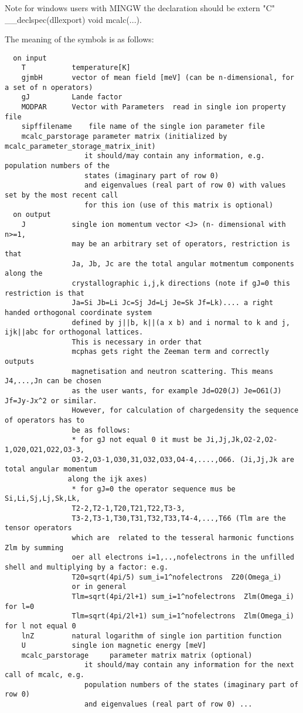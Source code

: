 Note for windows users with MINGW the declaration should be {\prg extern "C" \_\_declspec(dllexport) void %
mcalc(...)}.

The meaning of the symbols is as follows:
{\footnotesize
\begin{verbatim}
  on input
    T           temperature[K]
    gjmbH       vector of mean field [meV] (can be n-dimensional, for a set of n operators)
    gJ          Lande factor
    MODPAR      Vector with Parameters  read in single ion property file
    sipffilename    file name of the single ion parameter file
    mcalc_parstorage parameter matrix (initialized by mcalc_parameter_storage_matrix_init)
                   it should/may contain any information, e.g. population numbers of the
				   states (imaginary part of row 0)
                   and eigenvalues (real part of row 0) with values set by the most recent call
                   for this ion (use of this matrix is optional)
  on output    
    J           single ion momentum vector <J> (n- dimensional with n>=1,
                may be an arbitrary set of operators, restriction is that 
                Ja, Jb, Jc are the total angular motmentum components along the
                crystallographic i,j,k directions (note if gJ=0 this restriction is that
                Ja=Si Jb=Li Jc=Sj Jd=Lj Je=Sk Jf=Lk).... a right handed orthogonal coordinate system 
                defined by j||b, k||(a x b) and i normal to k and j, ijk||abc for orthogonal lattices. 
                This is necessary in order that
                mcphas gets right the Zeeman term and correctly outputs
                magnetisation and neutron scattering. This means J4,...,Jn can be chosen 
                as the user wants, for example Jd=O20(J) Je=O61(J) Jf=Jy-Jx^2 or similar.
                However, for calculation of chargedensity the sequence of operators has to
                be as follows: 
                * for gJ not equal 0 it must be Ji,Jj,Jk,O2-2,O2-1,O20,O21,O22,O3-3,
                O3-2,O3-1,O30,31,O32,O33,O4-4,....,O66. (Ji,Jj,Jk are total angular momentum
               along the ijk axes)
                * for gJ=0 the operator sequence mus be Si,Li,Sj,Lj,Sk,Lk,
                T2-2,T2-1,T20,T21,T22,T3-3,
                T3-2,T3-1,T30,T31,T32,T33,T4-4,...,T66 (Tlm are the tensor operators 
                which are  related to the tesseral harmonic functions Zlm by summing
                oer all electrons i=1,..,nofelectrons in the unfilled shell and multiplying by a factor: e.g.
                T20=sqrt(4pi/5) sum_i=1^nofelectrons  Z20(Omega_i)
                or in general
                Tlm=sqrt(4pi/2l+1) sum_i=1^nofelectrons  Zlm(Omega_i)  for l=0
                Tlm=sqrt(4pi/2l+1) sum_i=1^nofelectrons  Zlm(Omega_i)  for l not equal 0
    lnZ         natural logarithm of single ion partition function
    U           single ion magnetic energy [meV]
    mcalc_parstorage     parameter matrix matrix (optional)
                   it should/may contain any information for the next call of mcalc, e.g.
                   population numbers of the states (imaginary part of row 0)
                   and eigenvalues (real part of row 0) ...
\end{verbatim}
}
